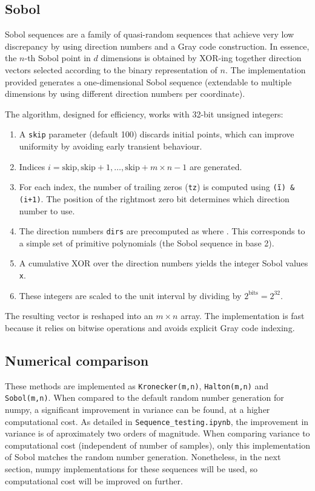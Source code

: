 \documentclass[11pt,oneside,parskip=half]{scrbook}  %
\begin{document}
\subsection{Sobol}

Sobol sequences are a family of quasi-random sequences that achieve very low discrepancy by using direction numbers and a Gray code construction. In essence, the $n$-th Sobol point in $d$ dimensions is obtained by XOR-ing together direction vectors selected according to the binary representation of $n$. The implementation provided generates a one-dimensional Sobol sequence (extendable to multiple dimensions by using different direction numbers per coordinate).

The algorithm, designed for efficiency, works with 32-bit unsigned integers:

\begin{enumerate}
    \item{A \texttt{skip} parameter (default 100) discards initial points, which can improve uniformity by avoiding early transient behaviour.}
    \item {Indices $i = \text{skip}, \text{skip}+1, \dots, \text{skip}+m \times n - 1$ are generated.}
    \item {For each index, the number of trailing zeros (\texttt{tz}) is computed using \texttt{(\~i) \& (i+1)}. The position of the rightmost zero bit determines which direction number to use.}
    \item {The direction numbers \texttt{dirs} are precomputed as  where . This corresponds to a simple set of primitive polynomials (the Sobol sequence in base 2).}
    \item {A cumulative XOR over the direction numbers yields the integer Sobol values \texttt{x}.}
    \item {These integers are scaled to the unit interval by dividing by $2^{\text{bits}} = 2^{32}$.}
\end{enumerate}

The resulting vector is reshaped into an $m \times n$ array. The implementation is fast because it relies on bitwise operations and avoids explicit Gray code indexing.

\subsection{Numerical comparison}

These methods are implemented as \texttt{Kronecker(m,n)}, \texttt{Halton(m,n)} and \texttt{Sobol(m,n)}. When compared to the default random number generation for numpy, a significant improvement in variance can be found, at a higher computational cost. As detailed in \texttt{Sequence\_testing.ipynb}, the improvement in variance is of aproximately two orders of magnitude. When comparing variance to computational cost (independent of number of samples), only this implementation of Sobol matches the random number generation. Nonetheless, in the next section, numpy implementations for these sequences will be used, so computational cost will be improved on further.
\end{document}
